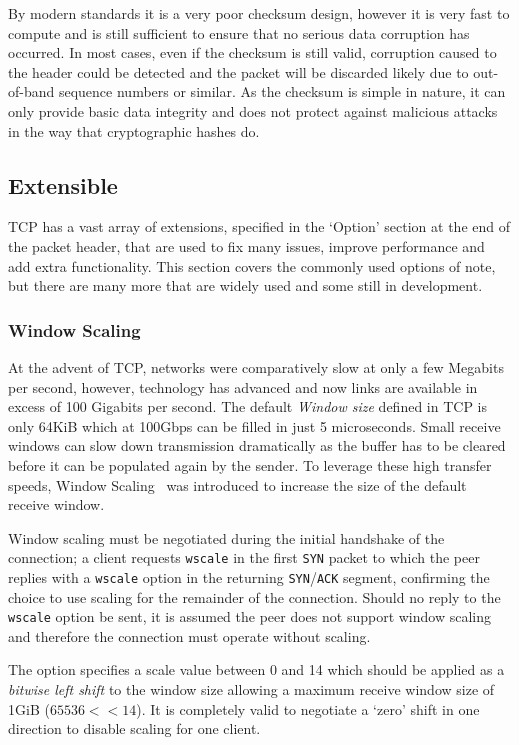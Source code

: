         By modern standards it is a very poor checksum design, however it is very fast to compute and is still sufficient to ensure that no serious data corruption has occurred. In most cases, even if the checksum is still valid, corruption caused to the header could be detected and the packet will be discarded likely due to out-of-band sequence numbers or similar. As the checksum is simple in nature, it can only provide basic data integrity and does not protect against malicious attacks in the way that cryptographic hashes do.
        
        \subsection{Extensible}
        \gls{TCP} has a vast array of extensions, specified in the `Option' section at the end of the packet header, that are used to fix many issues, improve performance and add extra functionality. This section covers the commonly used options of note, but there are many more that are widely used and some still in development.

        \subsubsection{Window Scaling}\label{sec:wscale}
            At the advent of \gls{TCP}, networks were comparatively slow at only a few Megabits per second, however, technology has advanced and now links are available in excess of 100 Gigabits per second. The default \textit{Window size} defined in \gls{TCP} is only 64KiB which at 100Gbps can be filled in just 5 microseconds. Small receive windows can slow down transmission dramatically as the buffer has to be cleared before it can be populated again by the sender. To leverage these high transfer speeds, Window Scaling~\cite[2]{rfc1323} was introduced to increase the size of the default receive window.

            Window scaling must be negotiated during the initial handshake of the connection; a client requests \texttt{wscale} in the first \texttt{SYN} packet to which the peer replies with a \texttt{wscale} option in the returning \texttt{SYN}/\texttt{ACK} segment, confirming the choice to use scaling for the remainder of the connection. Should no reply to the \texttt{wscale} option be sent, it is assumed the peer does not support window scaling and therefore the connection must operate without scaling.

            The option specifies a scale value between 0 and 14 which should be applied as a \textit{bitwise left shift} to the window size allowing a maximum receive window size of 1GiB ($65536 << 14$). It is completely valid to negotiate a `zero' shift in one direction to disable scaling for one client.

